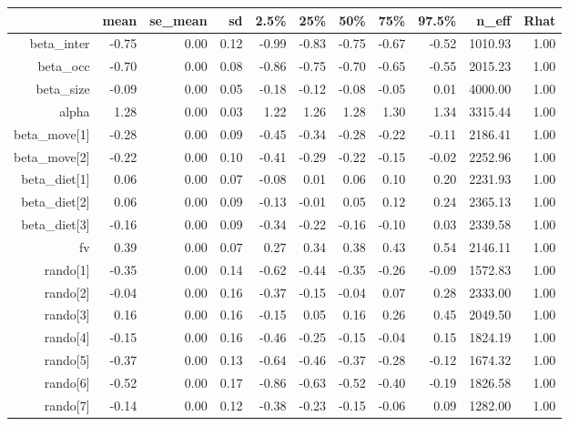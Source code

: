 \begin{table}[ht]
\centering
\begin{tabular}{rrrrrrrrrrr}
  \hline
 & mean & se\_mean & sd & 2.5\% & 25\% & 50\% & 75\% & 97.5\% & n\_eff & Rhat \\ 
  \hline
beta\_inter & -0.75 & 0.00 & 0.12 & -0.99 & -0.83 & -0.75 & -0.67 & -0.52 & 1010.93 & 1.00 \\ 
  beta\_occ & -0.70 & 0.00 & 0.08 & -0.86 & -0.75 & -0.70 & -0.65 & -0.55 & 2015.23 & 1.00 \\ 
  beta\_size & -0.09 & 0.00 & 0.05 & -0.18 & -0.12 & -0.08 & -0.05 & 0.01 & 4000.00 & 1.00 \\ 
  alpha & 1.28 & 0.00 & 0.03 & 1.22 & 1.26 & 1.28 & 1.30 & 1.34 & 3315.44 & 1.00 \\ 
  beta\_move[1] & -0.28 & 0.00 & 0.09 & -0.45 & -0.34 & -0.28 & -0.22 & -0.11 & 2186.41 & 1.00 \\ 
  beta\_move[2] & -0.22 & 0.00 & 0.10 & -0.41 & -0.29 & -0.22 & -0.15 & -0.02 & 2252.96 & 1.00 \\ 
  beta\_diet[1] & 0.06 & 0.00 & 0.07 & -0.08 & 0.01 & 0.06 & 0.10 & 0.20 & 2231.93 & 1.00 \\ 
  beta\_diet[2] & 0.06 & 0.00 & 0.09 & -0.13 & -0.01 & 0.05 & 0.12 & 0.24 & 2365.13 & 1.00 \\ 
  beta\_diet[3] & -0.16 & 0.00 & 0.09 & -0.34 & -0.22 & -0.16 & -0.10 & 0.03 & 2339.58 & 1.00 \\ 
  fv & 0.39 & 0.00 & 0.07 & 0.27 & 0.34 & 0.38 & 0.43 & 0.54 & 2146.11 & 1.00 \\ 
  rando[1] & -0.35 & 0.00 & 0.14 & -0.62 & -0.44 & -0.35 & -0.26 & -0.09 & 1572.83 & 1.00 \\ 
  rando[2] & -0.04 & 0.00 & 0.16 & -0.37 & -0.15 & -0.04 & 0.07 & 0.28 & 2333.00 & 1.00 \\ 
  rando[3] & 0.16 & 0.00 & 0.16 & -0.15 & 0.05 & 0.16 & 0.26 & 0.45 & 2049.50 & 1.00 \\ 
  rando[4] & -0.15 & 0.00 & 0.16 & -0.46 & -0.25 & -0.15 & -0.04 & 0.15 & 1824.19 & 1.00 \\ 
  rando[5] & -0.37 & 0.00 & 0.13 & -0.64 & -0.46 & -0.37 & -0.28 & -0.12 & 1674.32 & 1.00 \\ 
  rando[6] & -0.52 & 0.00 & 0.17 & -0.86 & -0.63 & -0.52 & -0.40 & -0.19 & 1826.58 & 1.00 \\ 
  rando[7] & -0.14 & 0.00 & 0.12 & -0.38 & -0.23 & -0.15 & -0.06 & 0.09 & 1282.00 & 1.00 \\ 

\end{tabular}
\end{table}
